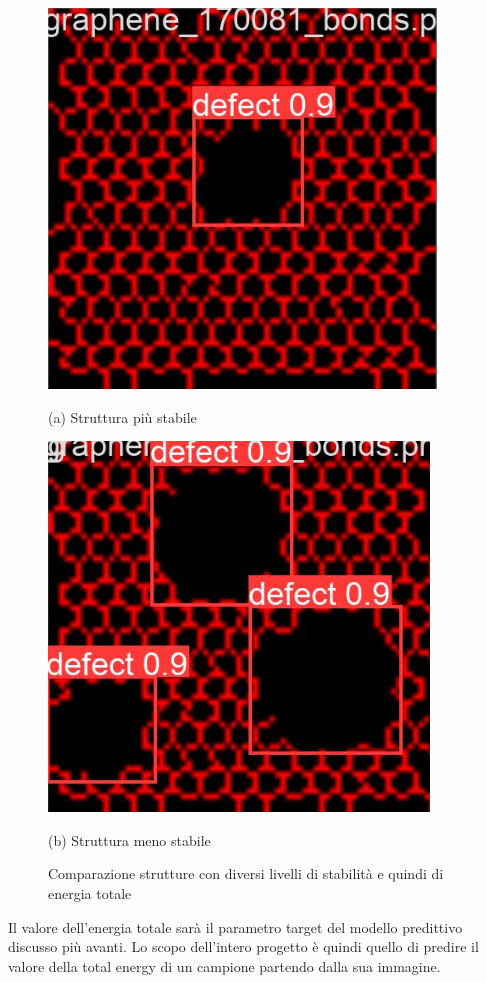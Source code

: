 \documentclass[12pt,a4paper,openright,twoside]{report}
\begin{document}
\begin{figure}[h]
\begin{minipage}[t]{0.49\linewidth}
\centering
\includegraphics[width=\linewidth]{stabile.png}

(a) Struttura più stabile
\end{minipage}%
\hfill\vrule\hfill
\begin{minipage}[t]{0.49\linewidth}
\centering
\includegraphics[width=\linewidth]{meno_stabile.png}

(b)  Struttura meno stabile 
\end{minipage}
\caption{Comparazione strutture con diversi livelli di stabilità e quindi di energia totale}
\end{figure}
Il valore dell'energia totale sarà il parametro target del modello predittivo discusso più avanti. Lo scopo dell'intero progetto è quindi quello di predire il valore della total energy di un campione partendo dalla sua immagine.  
\end{document}
